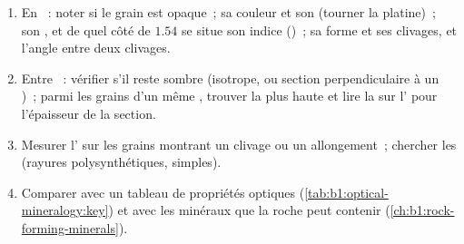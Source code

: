 \begin{method}\label{met:b1:optical-mineralogy:identify}
\begin{enumerate}
  \item En ~: noter si le grain est opaque~; sa
        couleur et son  (tourner la platine)~; son , et de quel
        côté de $1.54$ se situe son indice ()~; sa forme et ses
        clivages, et l'angle entre deux clivages.
  \item Entre ~: vérifier s'il reste sombre (isotrope, ou
        section perpendiculaire à un )~; parmi les grains d'un même
        , trouver la plus haute  et lire la
         sur l' pour l'épaisseur de la
        section.
  \item Mesurer l' sur les grains montrant un clivage ou un
        allongement~; chercher les  (rayures polysynthétiques, 
        simples).
  \item Comparer avec un tableau de propriétés optiques
        (\cref{tab:b1:optical-mineralogy:key}) et avec les minéraux que la roche
        peut contenir (\cref{ch:b1:rock-forming-minerals}).
\end{enumerate}
\end{method}

